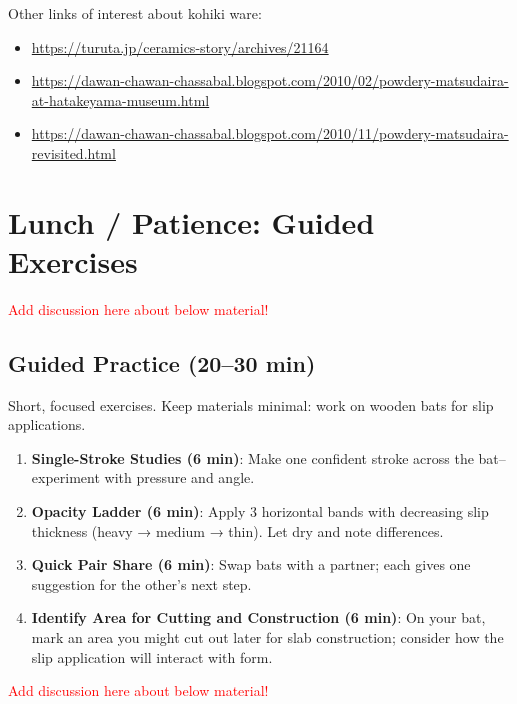 \documentclass[12pt]{scrartcl}
\begin{document}
Other links of interest about kohiki ware:
\begin{itemize}
  \item \url{https://turuta.jp/ceramics-story/archives/21164}
  \item \url{https://dawan-chawan-chassabal.blogspot.com/2010/02/powdery-matsudaira-at-hatakeyama-museum.html}
  \item \url{https://dawan-chawan-chassabal.blogspot.com/2010/11/powdery-matsudaira-revisited.html}
\end{itemize}


\section*{Lunch / Patience: Guided Exercises}

\textcolor{red}{Add discussion here about below material!}

\subsection*{Guided Practice (20--30 min)}
Short, focused exercises. Keep materials minimal: work on wooden bats for slip applications.
\begin{enumerate}
  \item \textbf{Single-Stroke Studies (6 min)}: Make one confident stroke across the bat--experiment with pressure and angle.
  \item \textbf{Opacity Ladder (6 min)}: Apply 3 horizontal bands with decreasing slip thickness (heavy → medium → thin). Let dry and note differences.
  \item \textbf{Quick Pair Share (6 min)}: Swap bats with a partner; each gives one suggestion for the other's next step.
  \item \textbf{Identify Area for Cutting and Construction (6 min)}: On your bat, mark an area you might cut out later for slab construction; consider how the slip application will interact with form.
\end{enumerate}

\textcolor{red}{Add discussion here about below material!}
\end{document}
